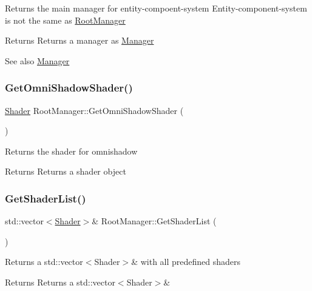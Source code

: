 Returns the main manager for entity-\/compoent-\/system Entity-\/component-\/system is not the same as \mbox{\hyperlink{class_root_manager}{Root\+Manager}} \begin{DoxyReturn}{Returns}
Returns a manager as \mbox{\hyperlink{class_manager}{Manager}} 
\end{DoxyReturn}
\begin{DoxySeeAlso}{See also}
\mbox{\hyperlink{class_manager}{Manager}} 
\end{DoxySeeAlso}
\mbox{\label{class_root_manager_a19c55ac08aba56e6d7c2d44d33b61e75}} 
\subsubsection{\texorpdfstring{GetOmniShadowShader()}{GetOmniShadowShader()}}
{\footnotesize\ttfamily \mbox{\hyperlink{class_shader}{Shader}} Root\+Manager\+::\+Get\+Omni\+Shadow\+Shader (\begin{DoxyParamCaption}{ }\end{DoxyParamCaption})\hspace{0.3cm}{\ttfamily [inline]}}

Returns the shader for omnishadow \begin{DoxyReturn}{Returns}
Returns a shader object 
\end{DoxyReturn}
\mbox{\label{class_root_manager_ab51dc622d82953446e44ae4212e5220b}} 
\subsubsection{\texorpdfstring{GetShaderList()}{GetShaderList()}}
{\footnotesize\ttfamily std\+::vector$<$\mbox{\hyperlink{class_shader}{Shader}}$>$\& Root\+Manager\+::\+Get\+Shader\+List (\begin{DoxyParamCaption}{ }\end{DoxyParamCaption})\hspace{0.3cm}{\ttfamily [inline]}}

Returns a std\+::vector$<$\+Shader$>$\& with all predefined shaders \begin{DoxyReturn}{Returns}
Returns a std\+::vector$<$\+Shader$>$\& 
\end{DoxyReturn}
\mbox{\label{class_root_manager_af5ee9d29d02ca9a8ca26bf0649862140}} 
